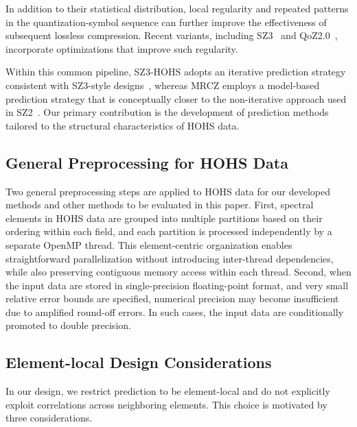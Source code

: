 In addition to their statistical distribution, local regularity and repeated patterns in the quantization-symbol sequence can further improve the effectiveness of subsequent lossless compression. Recent variants, including SZ3~\cite{liang2022sz3,zhao2021optimizing} and QoZ2.0~\cite{liu2024high}, incorporate optimizations that improve such regularity.

Within this common pipeline, SZ3-HOHS adopts an iterative prediction strategy consistent with SZ3-style designs~\cite{liang2022sz3,zhao2021optimizing}, whereas MRCZ employs a model-based prediction strategy that is conceptually closer to the non-iterative approach used in SZ2~\cite{tao2017significantly}. Our primary contribution is the development of prediction methods tailored to the structural characteristics of HOHS data.

\subsection{General Preprocessing for HOHS Data}

Two general preprocessing steps are applied to HOHS data for our developed methods and other methods to be evaluated in this paper. First, spectral elements in HOHS data are grouped into multiple partitions based on their ordering within each field, and each partition is processed independently by a separate OpenMP thread. This element-centric organization enables straightforward parallelization without introducing inter-thread dependencies, while also preserving contiguous memory access within each thread. Second, when the input data are stored in single-precision floating-point format, and very small relative error bounds are specified, numerical precision may become insufficient due to amplified round-off errors. In such cases, the input data are conditionally promoted to double precision.

\subsection{Element-local Design Considerations}

In our design, we restrict prediction to be element-local and do not explicitly exploit correlations across neighboring elements. This choice is motivated by three considerations.

